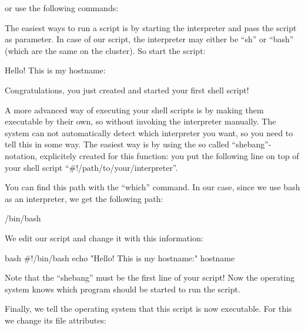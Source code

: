 \begin{prompt}
\end{prompt}

or use the following commands:
\begin{prompt}
\end{prompt}

The easiest ways to run a script is by starting the interpreter and pass the
script as parameter. In case of our script, the interpreter may either be ``sh''
or ``bash'' (which are the same on the cluster). So start the script:

\begin{prompt}
Hello! This is my hostname:
\end{prompt}

Congratulations, you just created and started your first shell script!

A more advanced way of executing your shell scripts is by making them
executable by their own, so without invoking the interpreter manually. The
system can not automatically detect which interpreter you want, so you need to
tell this in some way. The easiest way is by using the so called
``shebang''-notation, explicitely created for this function: you put the
following line on top of your shell script ``\#!/path/to/your/interpreter''.

You can find this path with the ``which'' command. In our case, since we use bash
as an interpreter, we get the following path:

\begin{prompt}
/bin/bash
\end{prompt}

We edit our script and change it with this information:

\begin{code}{bash}
#!/bin/bash
echo "Hello! This is my hostname:"
hostname
\end{code}

Note that the ``shebang'' must be the first line of your script! Now the
operating system knows which program should be started to run the script.

Finally, we tell the operating system that this script is now executable. For
this we change its file attributes:

\begin{prompt}
\end{prompt}

